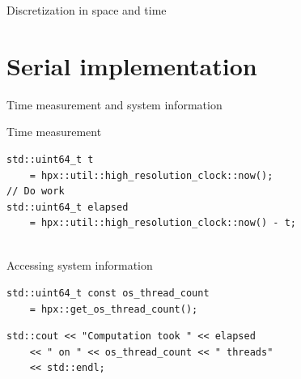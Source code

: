 \documentclass[12pt,t]{beamer}
\begin{document}
\begin{frame}{Discretization in space and time}

\begin{center}
\end{center}

\end{frame}

\section{Serial implementation}

\begin{frame}[fragile]{Time measurement and system information}

\begin{block}{Time measurement}
\begin{lstlisting}
std::uint64_t t 
	= hpx::util::high_resolution_clock::now();
// Do work 
std::uint64_t elapsed 
	= hpx::util::high_resolution_clock::now() - t;


\end{lstlisting}
\end{block}

\begin{block}{Accessing system information}
\begin{lstlisting}
std::uint64_t const os_thread_count 
	= hpx::get_os_thread_count();
\end{lstlisting}
\end{block}

\begin{lstlisting}
std::cout << "Computation took " << elapsed 
	<< " on " << os_thread_count << " threads" 
	<< std::endl;
\end{lstlisting}

\end{frame}
\end{document}

